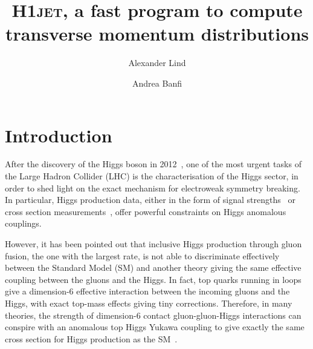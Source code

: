 \documentclass[12pt]{article}
\title{\vspace{-10mm}\textsc{H1jet}, a fast program to compute transverse momentum distributions\blfootnote{\textsc{H1jet} can be obtained from ref.~\cite{h1jet}.}}
\author[1]{Alexander Lind} %
\author[1]{Andrea Banfi} %
\affil[1]{Department of Physics and Astronomy, University of Sussex, BN1 9QH Brighton, UK}
\date{}
\begin{document}
\maketitle

\vspace{-10mm} 


\tableofcontents 

\newpage 

\section{Introduction}
\label{sec:intro}

After the discovery of the Higgs boson in
2012~\cite{Aad:2012tfa,Chatrchyan:2012ufa}, one of the most urgent tasks of
the Large Hadron Collider (LHC) is the characterisation of the Higgs
sector, in order to shed light on the exact mechanism for electroweak
symmetry breaking. In particular, Higgs production data, either in the
form of signal strengths~\cite{Aad:2019mbh,Sirunyan:2018koj} or cross
section measurements~\cite{Aaboud:2018ezd,Sirunyan:2018sgc}, offer
powerful constraints on Higgs anomalous couplings.

However, it has been pointed out that inclusive Higgs production
through gluon fusion, the one with the largest rate, is not able to
discriminate effectively between the Standard Model (SM) and another
theory giving the same effective coupling between the gluons and the
Higgs. In fact, top quarks running in loops give a dimension-6
effective interaction between the incoming gluons and the Higgs, with
exact top-mass effects giving tiny corrections. Therefore, in many
theories, the strength of dimension-6 contact gluon-gluon-Higgs
interactions can conspire with an anomalous top Higgs Yukawa coupling
to give exactly the same cross section for Higgs production as the
SM~\cite{Azatov:2013xha,Grojean:2013nya,Banfi:2013yoa}.
\end{document}
